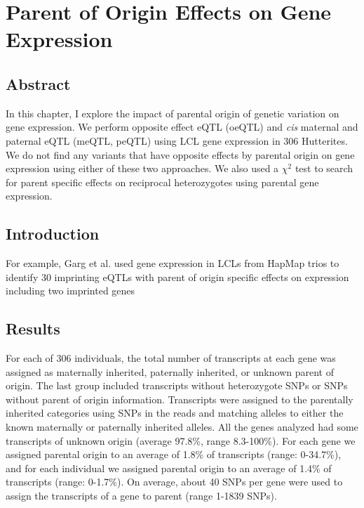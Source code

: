 
\chapter{Parent of Origin Effects on Gene Expression }\label{ch:poeqtl}
\section[Abstract]{Abstract}

In this chapter, I explore the impact of parental origin of genetic variation on gene expression. We perform opposite effect eQTL (oeQTL) and \emph{cis} maternal and paternal eQTL (meQTL, peQTL) using LCL gene expression in 306 Hutterites. We do not find any variants that have opposite effects by parental origin on gene expression using either of these two approaches. We also used a $\chi^2$ test to search for parent specific effects on reciprocal heterozygotes using parental gene expression. 


\section{Introduction}\label{ch04-introduction}

For example, Garg et al. used gene expression in LCLs from HapMap trios to identify 30 imprinting eQTLs with parent of origin specific effects on expression including two imprinted genes\cite{Garg2012a}

\section{Results}\label{ch04-results}

For each of 306 individuals, the total number of transcripts at each gene was assigned as maternally inherited, paternally inherited, or unknown parent of origin. The last group included transcripts without heterozygote SNPs or SNPs without parent of origin information. Transcripts were assigned to the parentally inherited categories using SNPs in the reads and matching alleles to either the known maternally or paternally inherited alleles. All the genes analyzed had some transcripts of unknown origin (average 97.8\%, range 8.3-100\%). For each gene we assigned parental origin to an average of 1.8\% of transcripts (range: 0-34.7\%), and for each individual we assigned parental origin to an average of 1.4\% of transcripts (range: 0-1.7\%). On average, about 40 SNPs per gene were used to assign the transcripts of a gene to parent (range 1-1839 SNPs). 


